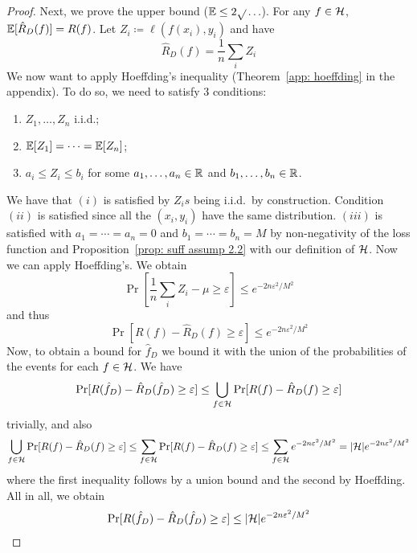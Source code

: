 \documentclass[reqno]{amsart}
\begin{document}
\begin{theorem}
\begin{proof}
Next, we prove the upper bound ($\mathbb{E} \le 2 \sqrt{}\ldots$). For any $f \in \mathcal{H}$, $\mathbb{E} [\hat R_D (f)]=R(f)$. Let $Z_i \coloneq \ell(f(x_i),y_i)$ and have
\[
\hat R_D(f) =\frac{1}{n}\sum_i Z_i 
\]
We now want to apply Hoeffding's inequality (Theorem~\ref{app: hoeffding} in the appendix). To do so, we need to satisfy 3 conditions:
\begin{enumerate}
    \item $Z_1, \ldots, Z_n$ i.i.d.;
    \item $\mathbb{E}[Z_1] = \cdots = \mathbb{E}[Z_n]$;
    \item $a_i \le Z_i \le b_i$ for some $a_1, \ldots, a_n \in \mathbb{R}$ and $b_1,\ldots,b_n\in\mathbb{R}$. 
\end{enumerate}

We have that $(i)$ is satisfied by ${Z_i}s$ being i.i.d.\ by construction. Condition $(ii)$ is satisfied since all the $(x_i,y_i)$ have the same distribution. $(iii)$ is satisfied with $a_1=\cdots=a_n=0$ and $b_1 = \cdots = b_n = M$ by non-negativity of the loss function and Proposition~\ref{prop: suff assump 2.2} with our definition of $\mathcal{H}$. 
Now we can apply Hoeffding's. We obtain 
\begin{equation*}
    \Pr [\frac{1}{n}\sum_i Z_i - \mu \ge \varepsilon] \le e^{-2n\varepsilon^2/M^2}
\end{equation*}
and thus
\begin{equation}\label{ineq: highprobbound}
    \Pr [ R(f) - \hat R_D(f) \ge \varepsilon]\le e^{- 2n\varepsilon^2/M^2}
\end{equation}
Now, to obtain a bound for $\hat f_D$ we bound it with the union of the probabilities of the events for each $f\in\mathcal{H}$. 
We have
\begin{equation}
    \Pr[R(\hat f_D)-\hat R_D(\hat f_D) \ge \varepsilon] \le \bigcup_{f \in \mathcal{H}} \Pr[R(f)-\hat R_D(f) \ge \varepsilon]
\end{equation}
trivially, and also 
\begin{equation}
    \bigcup_{f \in \mathcal{H}} \Pr[R(f)-\hat R_D(f) \ge \varepsilon] \le \sum_{f \in \mathcal{H}} \Pr[R(f)-\hat R_D(f) \ge \varepsilon] \le \sum_{f \in \mathcal{H}} e^{- 2n\varepsilon^2/M^2} = \vert \mathcal{H} \vert  e^{- 2n\varepsilon^2/M^2}
\end{equation}
where the first inequality follows by a union bound and the second by Hoeffding. All in all, we obtain
\begin{equation}\label{eq: upper bound}
    \Pr[R(\hat f_D)-\hat R_D(\hat f_D) \ge \varepsilon] \le \vert \mathcal{H} \vert  e^{- 2n\varepsilon^2/M^2}
\end{equation}


\end{proof}
\end{theorem}
\end{document}
